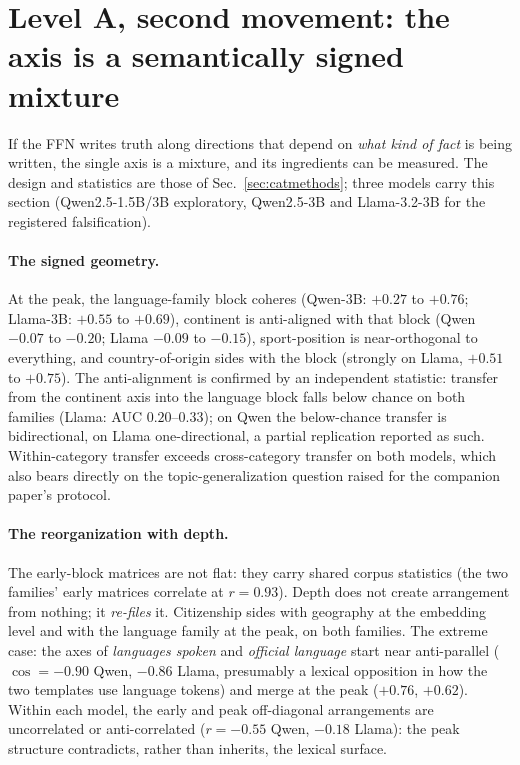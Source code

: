 \documentclass[11pt]{article}
\begin{document}
\section{Level A, second movement: the axis is a semantically signed mixture}
\label{sec:mixture}

If the FFN writes truth along directions that depend on \emph{what kind of
fact} is being written, the single axis is a mixture, and its ingredients
can be measured. The design and statistics are those of
Sec.~\ref{sec:catmethods}; three models carry this section (Qwen2.5-1.5B/3B
exploratory, Qwen2.5-3B and Llama-3.2-3B for the registered falsification).

\paragraph{The signed geometry.} At the peak, the language-family block
coheres (Qwen-3B: $+0.27$ to $+0.76$; Llama-3B: $+0.55$ to $+0.69$),
continent is anti-aligned with that block (Qwen $-0.07$ to $-0.20$; Llama
$-0.09$ to $-0.15$), sport-position is near-orthogonal to everything, and
country-of-origin sides with the block (strongly on Llama, $+0.51$ to
$+0.75$). The anti-alignment is confirmed by an independent statistic:
transfer from the continent axis into the language block falls below chance
on both families (Llama: AUC $0.20$--$0.33$); on Qwen the below-chance
transfer is bidirectional, on Llama one-directional, a partial replication
reported as such. Within-category transfer exceeds cross-category transfer
on both models, which also bears directly on the topic-generalization
question raised for the companion paper's protocol.

\paragraph{The reorganization with depth.} The early-block matrices are not
flat: they carry shared corpus statistics (the two families' early matrices
correlate at $r = 0.93$). Depth does not create arrangement from nothing; it
\emph{re-files} it. Citizenship sides with geography at the embedding level
and with the language family at the peak, on both families. The extreme
case: the axes of \emph{languages spoken} and \emph{official language} start
near anti-parallel ($\cos = -0.90$ Qwen, $-0.86$ Llama, presumably a lexical
opposition in how the two templates use language tokens) and merge at the
peak ($+0.76$, $+0.62$). Within each model, the early and peak off-diagonal
arrangements are uncorrelated or anti-correlated ($r = -0.55$ Qwen, $-0.18$
Llama): the peak structure contradicts, rather than inherits, the lexical
surface.
\end{document}
